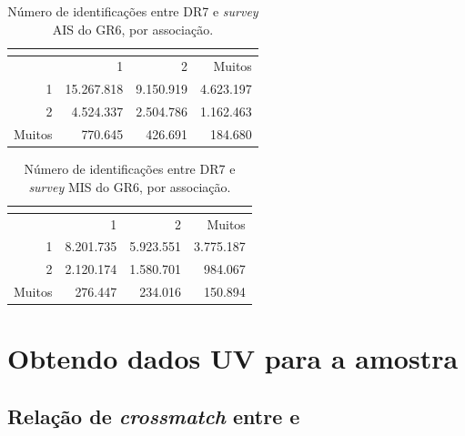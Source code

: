 \begin{table}
	\caption[Identificações entre \SDSS DR7 e {\em survey} AIS do \galex GR6.]
	{Número de identificações entre \SDSS DR7 e {\em survey} AIS do \galex GR6, por
	associação.}
	\setlength{\tabcolsep}{1cm}
	\begin{tabular}{r r r r}
		\galex &          \multicolumn{3}{c}{\SDSS} \\
		\midrule
		       &          1 &         2 &    Muitos \\
		1      & 15.267.818 & 9.150.919 & 4.623.197 \\
		2      &  4.524.337 & 2.504.786 & 1.162.463 \\
		Muitos &    770.645 &   426.691 &   184.680 \\
	\end{tabular}
	\label{tab:SDSSxGalexMatchesAIS}
\end{table}

\begin{table}
	\caption[Identificações entre \SDSS DR7 e {\em survey} AIS do \galex GR6.]
	{Número de identificações entre \SDSS DR7 e {\em survey} MIS do \galex GR6, por
	associação.}
	\setlength{\tabcolsep}{1cm}
	\begin{tabular}{r r r r}
		\galex &         \multicolumn{3}{c}{\SDSS} \\
		\midrule
		       &         1 &         2 &    Muitos \\
		1      & 8.201.735 & 5.923.551 & 3.775.187 \\
		2      & 2.120.174 & 1.580.701 &   984.067 \\
		Muitos &   276.447 &   234.016 &   150.894 \\
	\end{tabular}
	\label{tab:SDSSxGalexMatchesMIS}
\end{table}



\section{Obtendo dados UV para a amostra \STARLIGHT}
\label{sec:Crossmatch:DefAmostras}

\subsection{Relação de {\em crossmatch} entre \SDSS e \galex}

